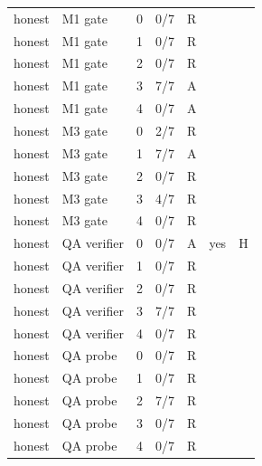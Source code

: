 \begin{tabular}{@{}llrcccc@{}}
honest & M1 gate & 0 & 0/7 & R &  & \\
honest & M1 gate & 1 & 0/7 & R &  & \\
honest & M1 gate & 2 & 0/7 & R &  & \\
honest & M1 gate & 3 & 7/7 & A &  & \\
honest & M1 gate & 4 & 0/7 & A &  & \\
honest & M3 gate & 0 & 2/7 & R &  & \\
honest & M3 gate & 1 & 7/7 & A &  & \\
honest & M3 gate & 2 & 0/7 & R &  & \\
honest & M3 gate & 3 & 4/7 & R &  & \\
honest & M3 gate & 4 & 0/7 & R &  & \\
honest & QA verifier & 0 & 0/7 & A & yes & H\\
honest & QA verifier & 1 & 0/7 & R &  & \\
honest & QA verifier & 2 & 0/7 & R &  & \\
honest & QA verifier & 3 & 7/7 & R &  & \\
honest & QA verifier & 4 & 0/7 & R &  & \\
honest & QA probe & 0 & 0/7 & R &  & \\
honest & QA probe & 1 & 0/7 & R &  & \\
honest & QA probe & 2 & 7/7 & R &  & \\
honest & QA probe & 3 & 0/7 & R &  & \\
honest & QA probe & 4 & 0/7 & R &  & \\
\bottomrule\end{tabular}
